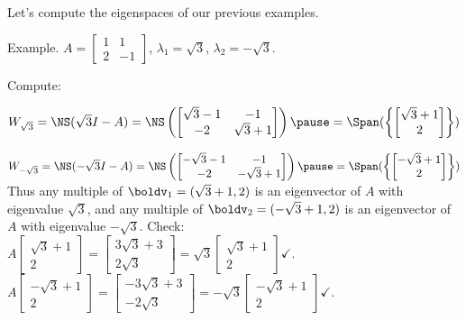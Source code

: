 \begin{frame}
Let's compute the eigenspaces of our previous examples. 

\alert{Example}. $A=\begin{bmatrix}
1&1\\
2&-1
\end{bmatrix}$, $\lambda_1=\sqrt{3}$, $\lambda_2=-\sqrt{3}$.
\begin{bsolution}
\pause Compute:

$W_{\sqrt{3}}=\NS(\sqrt{3}I-A)=\NS\left(\begin{bmatrix}\sqrt{3}-1&-1\\ -2&\sqrt{3}+1 \end{bmatrix}\right)\pause=\Span(\left\{ \begin{bmatrix}\sqrt{3}+1\\2\end{bmatrix} \right\})$

\pause
$W_{-\sqrt{3}}=\NS(-\sqrt{3}I-A)=\NS\left(\begin{bmatrix}-\sqrt{3}-1&-1\\ -2&-\sqrt{3}+1 \end{bmatrix}\right)\pause=\Span(\left\{ \begin{bmatrix}-\sqrt{3}+1\\ 2\end{bmatrix} \right\})$
\bpause Thus any multiple of $\boldv_1=(\sqrt{3}+1,2)$ is an eigenvector of $A$ with eigenvalue $\sqrt{3}$, and any multiple of $\boldv_2=(-\sqrt{3}+1,2)$ is an eigenvector of $A$ with eigenvalue $-\sqrt{3}$. 
\bpause
Check:
\bspace
$A\begin{bmatrix}\sqrt{3}+1\\ 2 \end{bmatrix}=\begin{bmatrix} 3\sqrt{3}+3\\ 2\sqrt{3} \end{bmatrix}=\sqrt{3}\begin{bmatrix}\sqrt{3}+1\\ 2 \end{bmatrix} \checkmark$. 
\bspace
$A\begin{bmatrix}-\sqrt{3}+1\\ 2 \end{bmatrix}=\begin{bmatrix} -3\sqrt{3}+3\\ -2\sqrt{3} \end{bmatrix}=-\sqrt{3}\begin{bmatrix}-\sqrt{3}+1\\ 2 \end{bmatrix} \checkmark$. 

\end{bsolution}
\end{frame}
